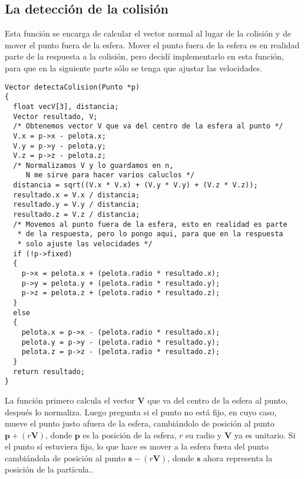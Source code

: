 \subsection{La detección de la colisión}
Esta función se encarga de calcular el vector normal al lugar de la colisión y de mover el punto fuera de la esfera.
Mover el punto fuera de la esfera es en realidad parte de la respuesta a la colisión, pero decidí implementarlo en esta función, para que en la siguiente parte sólo se tenga que ajustar las velocidades.
\begin{verbatim}
Vector detectaColision(Punto *p)
{
  float vecV[3], distancia;
  Vector resultado, V;
  /* Obtenemos vector V que va del centro de la esfera al punto */
  V.x = p->x - pelota.x;
  V.y = p->y - pelota.y;
  V.z = p->z - pelota.z;
  /* Normalizamos V y lo guardamos en n, 
     N me sirve para hacer varios caluclos */
  distancia = sqrt((V.x * V.x) + (V.y * V.y) + (V.z * V.z));
  resultado.x = V.x / distancia;
  resultado.y = V.y / distancia;
  resultado.z = V.z / distancia;
  /* Movemos al punto fuera de la esfera, esto en realidad es parte 
   * de la respuesta, pero lo pongo aqui, para que en la respuesta 
   * solo ajuste las velocidades */
  if (!p->fixed)
  {
    p->x = pelota.x + (pelota.radio * resultado.x);
    p->y = pelota.y + (pelota.radio * resultado.y);
    p->z = pelota.z + (pelota.radio * resultado.z);	
  }
  else
  {
    pelota.x = p->x - (pelota.radio * resultado.x);
    pelota.y = p->y - (pelota.radio * resultado.y);
    pelota.z = p->z - (pelota.radio * resultado.z);
  }
  return resultado;
}
\end{verbatim} 
La función primero calcula el vector $\textbf{V}$ que va del centro de la esfera al punto, después lo normaliza.
Luego pregunta si el punto no está fijo, en cuyo caso, mueve el punto justo afuera de la esfera, cambiándolo de posición al punto $\textbf{p} + (r\textbf{V})$, donde $\textbf{p}$ es la posición de la esfera, $r$ su radio y $\textbf{V}$ ya es unitario. Si el punto sí estuviera fijo, lo que hace es mover a la esfera fuera del punto cambiándola de posición al punto $\textbf{s} - (r\textbf{V})$, donde $\textbf{s}$ ahora representa la posición de la partícula..

